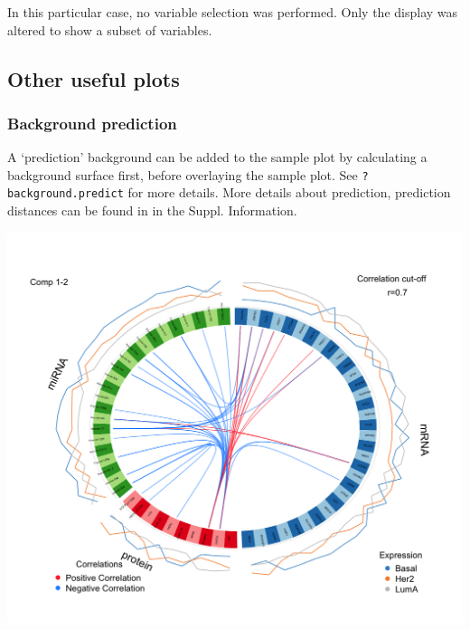 \documentclass[]{book}
\newenvironment{Shaded}{\begin{snugshade}}{\end{snugshade}}
\newcommand{\KeywordTok}[1]{\textcolor[rgb]{0.13,0.29,0.53}{\textbf{#1}}}
\newcommand{\DataTypeTok}[1]{\textcolor[rgb]{0.13,0.29,0.53}{#1}}
\newcommand{\DecValTok}[1]{\textcolor[rgb]{0.00,0.00,0.81}{#1}}
\newcommand{\StringTok}[1]{\textcolor[rgb]{0.31,0.60,0.02}{#1}}
\newcommand{\OtherTok}[1]{\textcolor[rgb]{0.56,0.35,0.01}{#1}}
\newcommand{\OperatorTok}[1]{\textcolor[rgb]{0.81,0.36,0.00}{\textbf{#1}}}
\newcommand{\NormalTok}[1]{#1}
\theoremstyle{definition}
\theoremstyle{definition}
\theoremstyle{definition}
\theoremstyle{remark}
\begin{document}
In this particular case, no variable selection was performed. Only the
display was altered to show a subset of variables.

\subsection{Other useful plots}\label{other-useful-plots-1}

\subsubsection{Background prediction}\label{background-prediction}

A `prediction' background can be added to the sample plot by calculating
a background surface first, before overlaying the sample plot. See
\texttt{?background.predict} for more details. More details about
prediction, prediction distances can be found in \citep{mixomics} in the
Suppl. Information.

\begin{Shaded}
\end{Shaded}

\begin{center}\includegraphics[width=0.5\linewidth]{Figures/unnamed-chunk-7-1} \end{center}
\end{document}
